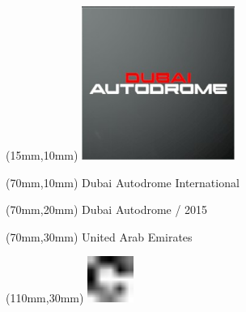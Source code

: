 \null\newpage
\begin{textblock*}{50mm}(15mm,10mm)%
\includegraphics[width=50mm]{LG/2015-05-20_00081.png}
\end{textblock*}
\begin{textblock*}{130mm}(70mm,10mm)%
{\fontsize{20}{20}\selectfont Dubai Autodrome International}\\
\end{textblock*}
\begin{textblock*}{120mm}(70mm,20mm)%
{\fontsize{16}{16}\selectfont Dubai Autodrome / 2015}\\
\end{textblock*}
\begin{textblock*}{120mm}(70mm,30mm)%
{\fontsize{12}{12}\selectfont United Arab Emirates}
\end{textblock*}
\begin{textblock*}{30mm}(110mm,30mm)%
\centering
\includegraphics[height=15mm]{icons/fa-rotate-right.pdf}
\end{textblock*}
